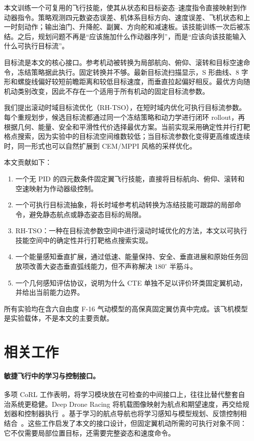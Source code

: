 \documentclass{article}
\newcommand{\rhtso}{RH-TSO}
\begin{document}
本文训练一个可复用的飞行技能，使其从状态和目标姿态--速度指令直接映射到作动器指令。策略观测四元数姿态误差、机体系目标方向、速度误差、飞机状态和上一时刻动作；输出油门、升降舵、副翼、方向舵和减速板。该技能训练一次后被冻结。之后，规划问题不再是“应该施加什么作动器序列”，而是“应该向该技能输入什么可执行目标流”。

目标流是本文的核心接口。参考机动被转换为局部航向、俯仰、滚转和目标空速命令，冻结策略据此执行。固定转换并不够。最新目标流扫描显示，S 形曲线、8 字形和螺旋线偏好较短前瞻距离和较低目标速度，而垂直拉起偏好相反。最优方向随机动类别改变，因此不存在一个适用于所有机动的固定目标流参数。

我们提出滚动时域目标流优化（\rhtso），在短时域内优化可执行目标流参数。每个重规划步，候选目标流都通过同一个冻结策略和动力学进行闭环 rollout，再根据几何、能量、安全和平滑性代价选择最优方案。当前实现采用确定性并行打靶格点搜索，因为实验中的目标流空间维数较低；当目标流参数化变得更高维或连续时，同一形式也可以自然扩展到 CEM/MPPI 风格的采样优化。

本文贡献如下：
\begin{enumerate}
  \item 一个无 PID 的四元数条件固定翼飞行技能，直接将目标航向、俯仰、滚转和空速映射为作动器级控制。
  \item 一个可执行目标流抽象，将长时域参考机动转换为冻结技能可跟踪的局部命令，避免静态航点或静态姿态目标的局限。
  \item \rhtso：一种在目标流参数空间中进行滚动时域优化的方法，本文以可执行技能空间中的确定性并行打靶格点搜索实现。
  \item 一个能量感知垂直扩展，通过低速、能量保持、安全、垂直进展和原始任务回放项改善大姿态垂直弧线能力，但不声称解决 $180^\circ$ 半筋斗。
  \item 一个几何感知评估协议，说明为什么 CTE 单独不足以评价环类固定翼机动，并给出当前能力边界。
\end{enumerate}

所有实验均在含六自由度 F-16 气动模型的高保真固定翼仿真中完成。该飞机模型是实验载体，不是本文的主要贡献。


\section{相关工作}

\paragraph{敏捷飞行中的学习与控制接口。}
多项 CoRL 工作表明，将学习模块放在可检查的中间接口上，往往比替代整套自治系统更稳健。Deep Drone Racing 将机载图像映射为航点和期望速度，再交给规划器和控制器执行~\citep{kaufmann2018deep}。基于学习的航点导航也将学习感知与模型规划、反馈控制相结合~\citep{bansal2019combining}。这些工作启发了本文的接口设计，但固定翼机动所需的可执行对象不同：它不仅需要局部位置目标，还需要完整姿态和速度命令。
\end{document}
